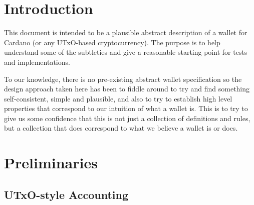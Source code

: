 \documentclass{article}
\begin{document}
\section{Introduction}

This document is intended to be a plausible abstract description of a wallet
for Cardano (or any UTxO-based cryptocurrency). The purpose is to help
understand some of the subtleties and give a reasonable starting point for
tests and implementations.

To our knowledge, there is no pre-existing abstract wallet specification so the
design approach taken here has been to fiddle around to try and find something
self-consistent, simple and plausible, and also to try to establish high level
properties that correspond to our intuition of what a wallet is. This is to try
to give us some confidence that this is not just a collection of definitions
and rules, but a collection that does correspond to what we believe a wallet is
or does.

\section{Preliminaries}

\subsection{UTxO-style Accounting}
\end{document}
